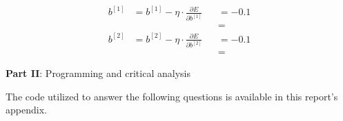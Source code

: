 \documentclass[12pt]{article}
\begin{document}
\begin{enumerate}[leftmargin=\labelsep]
\begin{enumerate}
                \begin{equation*}
                  \begin{aligned}
                    b^{[1]} & = b^{[1]} - \eta \cdot \frac{\partial E}{\partial b^{[1]}} &  &
                    =  - 0.1    \\ & &
                            & =                     \\
                    b^{[2]} & = b^{[2]} - \eta \cdot \frac{\partial E}{\partial b^{[2]}} &  &
                    =  - 0.1    \\ & &
                            & = 
                  \end{aligned}
                \end{equation*}

        \end{enumerate}

\end{enumerate}

\pagebreak

\center\large{\textbf{Part II}: Programming and critical analysis}

\begin{justify}
  The code utilized to answer the following questions is available in this
  report's appendix.
\end{justify}
\end{document}
